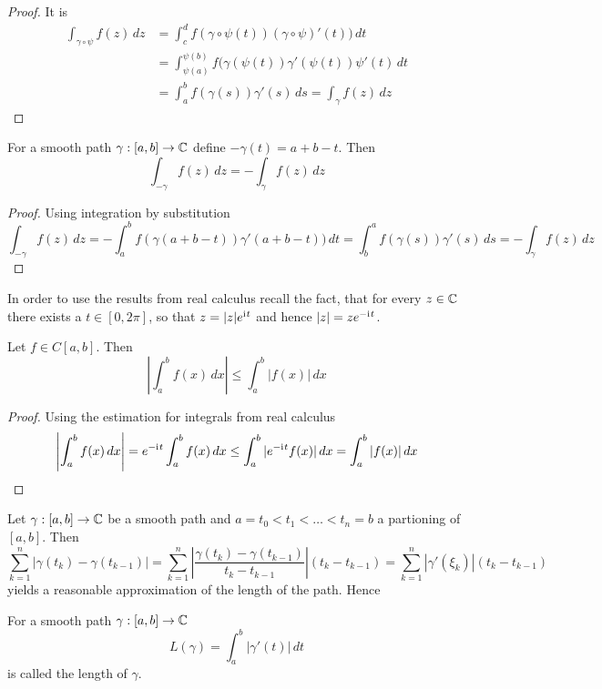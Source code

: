 \begin{proof} It is 
	\[
		\begin{split}
			\int_{\gamma\circ\psi} f(z)\,dz
				 & = \int_c^d f(\gamma\circ\psi(t))(\gamma\circ\psi)'(t)) \,dt \\
				 & = \int_{\psi(a)}^{\psi(b)} f(\gamma(\psi(t))\gamma'(\psi(t))\psi'(t) \,dt \\
				 & = \int_a^b f(\gamma(s))\gamma'(s) \,ds = \int_{\gamma} f(z)\,dz
		\end{split}
	\]
\end{proof}
\bigskip


\begin{lemma}
For a smooth path \( \gamma: [a,b] \to \mathbb{C} \) define \(-\gamma(t) = a + b - t \).
Then
	\[
		\int_{-\gamma} f(z)\,dz = -\int_{\gamma} f(z)\,dz
	\]
\end{lemma}

\begin{proof} Using integration by substitution	 
	\[
		\int_{-\gamma} f(z)\,dz
			  = - \int_a^b f(\gamma(a + b - t))\gamma'(a + b - t)) \,dt 
			  = \int_b^a f(\gamma(s))\gamma'(s) \,ds 
			  = - \int_{\gamma} f(z)\,dz
	\]
\end{proof}
\bigskip


In order to use the results from real calculus recall the fact, that for every \( z \in \mathbb{C} \) 
there exists a \( t \in [0,2\pi] \), so that \( z = |z|e^{\mathrm{i}\mkern1mu t} \) and hence \( |z| = ze^{-\mathrm{i}\mkern1mu t} \).
\bigskip


\begin{lemma}
Let \( f \in C[a,b] \). Then
	\[
		\left|\int_a^b f(x)\,dx \right| \le \int_a^b |f(x)|\,dx
	\]
\end{lemma}

\begin{proof} Using the estimation for integrals from real calculus
	\[
		\left|\int_a^b f(x)\,dx \right|  = e^{-\mathrm{i}\mkern1mu t}\int_a^b f(x)\,dx \le \int_a^b |e^{-\mathrm{i}\mkern1mu t}f(x)|\,dx
			= \int_a^b |f(x)|\,dx
	\]
\end{proof}
\bigskip


Let \( \gamma: [a,b] \to \mathbb{C} \) be a smooth path and \( a = t_0 < t_1 < \dots < t_n = b \) 
a partioning of \( [a,b] \). Then 
\[
	\sum_{k = 1}^n |\gamma(t_k) - \gamma(t_{k - 1})|
		= \sum_{k = 1}^n \left| \frac{\gamma(t_k) - \gamma(t_{k - 1})}{t_k - t_{k - 1}} \right| (t_k - t_{k - 1})
		= \sum_{k = 1}^n | \gamma'(\xi_k)| (t_k - t_{k - 1})
\]
yields a reasonable approximation of the length of the path. Hence
\bigskip


\begin{definition}
For a smooth path \( \gamma: [a,b] \to \mathbb{C} \) 
\[
	L(\gamma) = \int_a^b |\gamma'(t)|\,dt 
\]
is called the length of \( \gamma \).
\end{definition}
\bigskip


